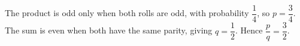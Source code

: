 The product is odd only when both rolls are odd, with probability $\dfrac{1}{4}$, so $p=\dfrac{3}{4}$. The sum is even when both have the same parity, giving $q=\dfrac{1}{2}$. Hence $\dfrac{p}{q}=\boxed{\dfrac{3}{2}}$.
